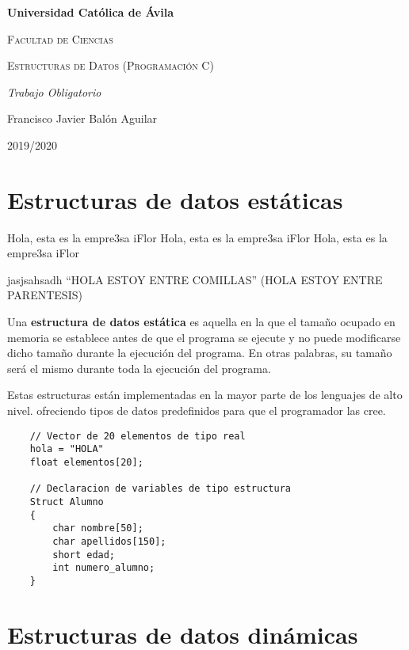 \documentclass[a4paper, 11pt, titlepage]{article}
\newcommand{\nombreEmpresa}{iFlor }
\newcommand{\alberto}[2]{``#1'' (#2)}
\begin{document}
\begin{titlepage}
    \centering
    \vspace{1cm}
    {\bfseries\LARGE Universidad Católica de Ávila \par}
    \vspace{1cm}
    {\scshape\Large Facultad de Ciencias \par}
    \vspace{3cm}
    {\scshape\Huge Estructuras de Datos (Programación C) \par}
    \vspace{3cm}
    {\itshape\Large Trabajo Obligatorio \par}
    \vfill
    {\Large Francisco Javier Balón Aguilar \par}
    \vfill
    {\Large 2019/2020 \par}
\end{titlepage}


\renewcommand{\contentsname}{Índice}
\tableofcontents
\newpage

\section{Estructuras de datos estáticas}

Hola, esta es la empre3sa \nombreEmpresa Hola, esta es la empre3sa \nombreEmpresa Hola, esta es la empre3sa \nombreEmpresa

jasjsahsadh \alberto{HOLA ESTOY ENTRE COMILLAS}{HOLA ESTOY ENTRE PARENTESIS}

Una \textbf{estructura de datos estática} es aquella en la que el tamaño ocupado en memoria se
establece antes de que el programa se ejecute y no puede modificarse dicho tamaño durante
la ejecución del programa. En otras palabras, su tamaño será el mismo durante toda la ejecución
del programa.

Estas estructuras están implementadas en la mayor parte de los lenguajes de alto nivel. ofreciendo
tipos de datos predefinidos para que el programador las cree.

    \begin{lstlisting}
    // Vector de 20 elementos de tipo real
    hola = "HOLA"
    float elementos[20];

    // Declaracion de variables de tipo estructura
    Struct Alumno
    {
        char nombre[50];
        char apellidos[150];
        short edad;
        int numero_alumno;
    }
    \end{lstlisting}

\section{Estructuras de datos dinámicas}
\end{document}
